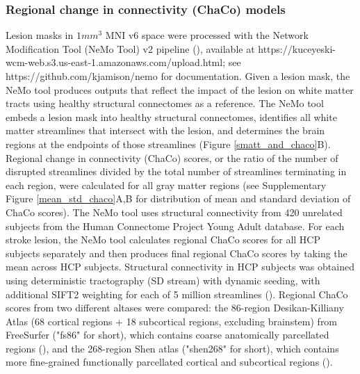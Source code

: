 \documentclass[10pt]{article}
\def\Plus{\texttt{+}}
\begin{document}
\subsubsection*{Regional change in connectivity (ChaCo) models}
Lesion masks in $1mm^3$ MNI v6 space were processed with the Network Modification Tool (NeMo Tool) v2 pipeline (\cite{Kuceyeski2013-nk}), available at https://kuceyeski-wcm-web.s3.us-east-1.amazonaws.com/upload.html; see https://github.com/kjamison/nemo for documentation. Given a lesion mask, the NeMo tool produces outputs that reflect the impact of the lesion on white matter tracts using healthy structural connectomes as a reference. The NeMo tool embeds a lesion mask into healthy structural connectomes, identifies all white matter streamlines that intersect with the lesion, and determines the brain regions at the endpoints of those streamlines (Figure \ref{smatt_and_chaco}B). Regional change in connectivity (ChaCo) scores, or the ratio of the number of disrupted streamlines divided by the total number of streamlines terminating in each region, were calculated for all gray matter regions (see Supplementary Figure \ref{mean_std_chaco}A,B for distribution of mean and standard deviation of ChaCo scores). The NeMo tool uses structural connectivity from 420 unrelated subjects from the Human Connectome Project Young Adult database. For each stroke lesion, the NeMo tool calculates regional ChaCo scores for all HCP subjects separately and then produces final regional ChaCo scores by taking the mean across HCP subjects. Structural connectivity in HCP subjects was obtained using deterministic tractography (SD stream) with dynamic seeding, with additional SIFT2 weighting for each of 5 million streamlines (\cite{Smith2015-eb}). Regional ChaCo scores from two different altases were compared: the 86-region Desikan-Killiany Atlas (68 cortical regions $\Plus$ 18 subcortical regions, excluding brainstem) from FreeSurfer ("fs86" for short), which contains coarse anatomically parcellated regions (\cite{Desikan2006-vf,Fischl2002-lb}), and the 268-region Shen atlas ("shen268" for short), which contains more fine-grained functionally parcellated cortical and subcortical regions (\cite{Shen2013-zn}).
\end{document}
